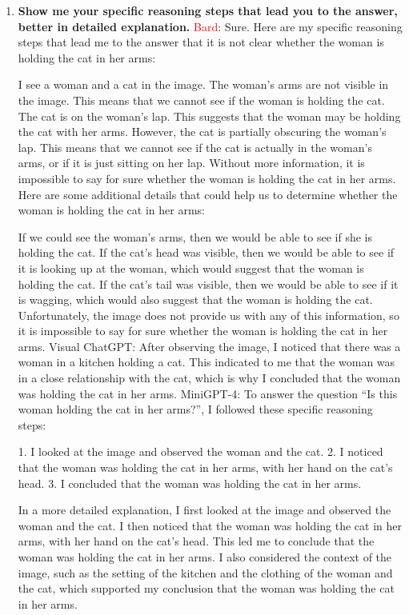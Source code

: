 \begin{enumerate}
    Without more information, it is impossible to say for sure whether the woman is holding the cat in her arms.
    \subitem Visual ChatGPT: Yes, the woman is holding the cat in her arms.
    \subitem MiniGPT-4: Yes, the woman is holding the cat in her arms.
    \item \textbf{Show me your specific reasoning steps that lead you to the answer, better in detailed explanation.}
    \subitem \textcolor{Red}{Bard}: Sure. Here are my specific reasoning steps that lead me to the answer that it is not clear whether the woman is holding the cat in her arms:

    I see a woman and a cat in the image.
    The woman's arms are not visible in the image. This means that we cannot see if the woman is holding the cat.
    The cat is on the woman's lap. This suggests that the woman may be holding the cat with her arms.
    However, the cat is partially obscuring the woman's lap. This means that we cannot see if the cat is actually in the woman's arms, or if it is just sitting on her lap.
    Without more information, it is impossible to say for sure whether the woman is holding the cat in her arms.
    Here are some additional details that could help us to determine whether the woman is holding the cat in her arms:
    
    If we could see the woman's arms, then we would be able to see if she is holding the cat.
    If the cat's head was visible, then we would be able to see if it is looking up at the woman, which would suggest that the woman is holding the cat.
    If the cat's tail was visible, then we would be able to see if it is wagging, which would also suggest that the woman is holding the cat.
    Unfortunately, the image does not provide us with any of this information, so it is impossible to say for sure whether the woman is holding the cat in her arms.
    \subitem Visual ChatGPT: After observing the image, I noticed that there was a woman in a kitchen holding a cat. This indicated to me that the woman was in a close relationship with the cat, which is why I concluded that the woman was holding the cat in her arms.
    \subitem MiniGPT-4: To answer the question “Is this woman holding the cat in her arms?”, I followed these specific reasoning steps:

    1. I looked at the image and observed the woman and the cat.
    2. I noticed that the woman was holding the cat in her arms, with her hand on the cat’s head.
    3. I concluded that the woman was holding the cat in her arms.
    
    In a more detailed explanation, I first looked at the image and observed the woman and the cat. I then noticed that the woman was holding the cat in her arms, with her hand on the cat’s head. This led me to conclude that the woman was holding the cat in her arms. I also considered the context of the image, such as the setting of the kitchen and the clothing of the woman and the cat, which supported my conclusion that the woman was holding the cat in her arms.
\end{enumerate}